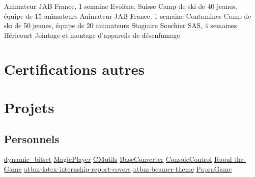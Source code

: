 \documentclass[a4paper,10pt,sans]{moderncv}
\renewcommand{\deletedSpace}{-2mm}
\begin{document}
			\vspace{5pt}
			{Animateur}
			{JAB France, 1 semaine}
			{Evolène, Suisse}
			{Camp de ski de 40 jeunes, équipe de 15 animateurs}
			{}
			{Animateur}
			{JAB France, 1 semaine}
			{Contamines}
			{Camp de ski de 50 jeunes, équipe de 20 animateurs}
			{}
			{Stagiaire}
			{Souchier SAS, 4 semaines}
			{Héricourt}
			{Jointage et montage d'appareils de désenfumage}
			{}

	\newpage


	\section{Certifications autres}


	\vspace*{\deletedSpace}
	\section{Projets}
		\subsection{Personnels}
				{\href{https://github.com/pinam45/dynamic_bitset}{dynamic\_bitset}}
				{\href{https://github.com/pinam45/MagicPlayer}{MagicPlayer}}
				{\href{https://github.com/pinam45/CMutils}{CMutils}}
				{\href{https://github.com/pinam45/BaseConverter}{BaseConverter}}
				{\href{https://github.com/pinam45/ConsoleControl}{ConsoleControl}}
				{\href{https://github.com/TiWinDeTea/Raoul-the-Game}{Raoul-the-Game}}
				{\href{https://github.com/pinam45/utbm-latex-internship-report-covers}{utbm-latex-internship-report-covers}}
				{\href{https://github.com/pinam45/utbm-beamer-theme}{utbm-beamer-theme}}
				{\href{https://github.com/TiWinDeTea/PapraGame}{PapraGame}}
\end{document}
